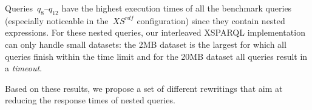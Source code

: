 Queries~$q_{8}$--$q_{12}$ have the highest execution times of all the benchmark queries (especially noticeable in
the~$\mathit{XS^{rdf}}$ configuration) since they contain nested expressions.  For these nested queries, our interleaved
 XSPARQL implementation can only handle small datasets: the 2MB dataset is the largest for which all
queries finish within the time limit and for the 20MB dataset all queries result in a \emph{timeout}.

Based on these results, we propose a set of different rewritings that aim at reducing the response times of nested
queries.




